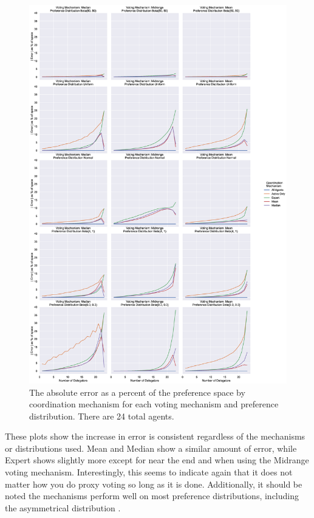 \begin{figure}[p]
    \centering
    \includegraphics[scale=0.30]
    {content/chapter2/figures/distribution_error_as_percent_of_space_abs_mean}
    \caption{
        The absolute error as a percent of the preference space by coordination
        mechanism for each voting mechanism and preference distribution.
        There are 24 total agents.
    }
    \label{fig:distribution-error-as-percent-of-space-abs-mean}
\end{figure}

These plots show the increase in error is consistent regardless of the mechanisms or
distributions used.
Mean and Median show a similar amount of error, while Expert shows slightly more
except for near the end and when using the Midrange voting mechanism.
Interestingly, this seems to indicate again that it does not matter how you do proxy
voting so long as it is done.
Additionally, it should be noted the mechanisms perform well on most preference
distributions, including the asymmetrical distribution .

